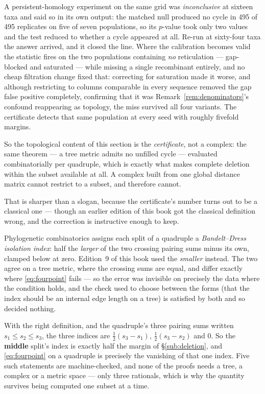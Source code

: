 \begin{ledger}
A persistent-homology experiment on the same grid was \emph{inconclusive} at
sixteen taxa and said so in its own output: the matched null produced no cycle in
495 of 495 replicates on five of seven populations, so its $p$-value took only
two values and the test reduced to whether a cycle appeared at all. Re-run at
sixty-four taxa the answer arrived, and it closed the line. Where the calibration
becomes valid the statistic fires on the two populations containing \emph{no}
reticulation --- gap-blocked and saturated --- while missing a single recombinant
entirely, and no cheap filtration change fixed that: correcting for saturation
made it worse, and although restricting to columns comparable in every sequence
removed the gap false positive completely, confirming that it was
Remark~\ref{rem:denominators}'s confound reappearing as topology, the miss
survived all four variants. The certificate detects that same population at every
seed with roughly fivefold margins.

So the topological content of this section is the \emph{certificate}, not a
complex: the same theorem --- a tree metric admits no unfilled cycle --- evaluated
combinatorially per quadruple, which is exactly what makes complete deletion
within the subset available at all. A complex built from one global distance
matrix cannot restrict to a subset, and therefore cannot.

That is sharper than a slogan, because the certificate's number turns out to be a
classical one --- though an earlier edition of this book got the classical
definition wrong, and the correction is instructive enough to keep.

Phylogenetic combinatorics assigns each split of a quadruple a
\emph{Bandelt--Dress isolation index}: half the \emph{larger} of the two crossing
pairing sums minus its own, clamped below at zero. Edition~9 of this book used
the \emph{smaller} instead. The two agree on a tree metric, where the crossing
sums are equal, and differ exactly where \eqref{eq:fourpoint} fails --- so the
error was invisible on precisely the data where the condition holds, and the
check used to choose between the forms (that the index should be an internal edge
length on a tree) is satisfied by both and so decided nothing.

With the right definition, and the quadruple's three pairing sums written
$s_1 \le s_2 \le s_3$, the three indices are $\tfrac12(s_3-s_1)$,
$\tfrac12(s_3-s_2)$ and $0$. So the \textbf{middle} split's index is exactly half
the margin of \S\ref{sub:deletion}, and \eqref{eq:fourpoint} on a quadruple is
precisely the vanishing of that one index. Five such statements are
machine-checked, and none of the proofs needs a tree, a complex or a metric space
--- only three rationals, which is why the quantity survives being computed one
subset at a time.


\end{ledger}
